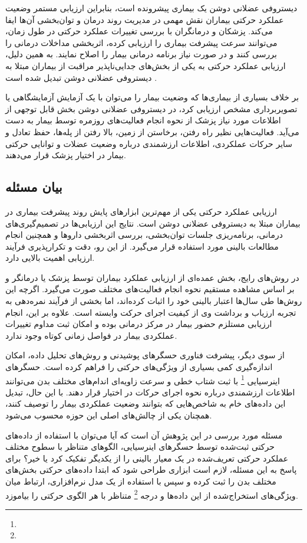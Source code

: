 دیستروفی عضلانی دوشن یک بیماری پیشرونده است، بنابراین ارزیابی مستمر وضعیت عملکرد حرکتی بیماران نقش مهمی در مدیریت روند درمان و توان‌بخشی آن‌ها ایفا می‌کند. پزشکان و درمانگران با بررسی تغییرات عملکرد حرکتی در طول زمان، می‌توانند سرعت پیشرفت بیماری را ارزیابی کرده، اثربخشی مداخلات درمانی را بررسی کنند و در صورت نیاز برنامه درمانی بیمار را اصلاح نمایند. به همین دلیل، ارزیابی عملکرد حرکتی به یکی از بخش‌های جدایی‌ناپذیر مراقبت از بیماران مبتلا به دیستروفی عضلانی دوشن تبدیل شده است \cite{Bushby2010Diagnosis}.

بر خلاف بسیاری از بیماری‌ها که وضعیت بیمار را می‌توان با یک آزمایش آزمایشگاهی یا تصویربرداری مشخص ارزیابی کرد، در دیستروفی عضلانی دوشن بخش قابل توجهی از اطلاعات مورد نیاز پزشک از نحوه انجام فعالیت‌های روزمره توسط بیمار به دست می‌آید. فعالیت‌هایی نظیر راه رفتن، برخاستن از زمین، بالا رفتن از پله‌ها، حفظ تعادل و سایر حرکات عملکردی، اطلاعات ارزشمندی درباره وضعیت عضلات و توانایی حرکتی بیمار در اختیار پزشک قرار می‌دهند.

\subsection{بیان مسئله}

ارزیابی عملکرد حرکتی یکی از مهم‌ترین ابزارهای پایش روند پیشرفت بیماری در بیماران مبتلا به دیستروفی عضلانی دوشن است. نتایج این ارزیابی‌ها در تصمیم‌گیری‌های درمانی، برنامه‌ریزی جلسات توان‌بخشی، بررسی اثربخشی داروها و همچنین انجام مطالعات بالینی مورد استفاده قرار می‌گیرد. از این رو، دقت و تکرارپذیری فرآیند ارزیابی اهمیت بالایی دارد.

در روش‌های رایج، بخش عمده‌ای از ارزیابی عملکرد بیماران توسط پزشک یا درمانگر و بر اساس مشاهده مستقیم نحوه انجام فعالیت‌های مختلف صورت می‌گیرد. اگرچه این روش‌ها طی سال‌ها اعتبار بالینی خود را اثبات کرده‌اند، اما بخشی از فرآیند نمره‌دهی به تجربه ارزیاب و برداشت وی از کیفیت اجرای حرکت وابسته است. علاوه بر این، انجام ارزیابی مستلزم حضور بیمار در مرکز درمانی بوده و امکان ثبت مداوم تغییرات عملکردی بیمار در فواصل زمانی کوتاه وجود ندارد.

از سوی دیگر، پیشرفت فناوری حسگرهای پوشیدنی و روش‌های تحلیل داده، امکان اندازه‌گیری کمی بسیاری از ویژگی‌های حرکتی را فراهم کرده است. حسگرهای اینرسیایی
\footnote{}
با ثبت شتاب خطی و سرعت زاویه‌ای اندام‌های مختلف بدن می‌توانند اطلاعات ارزشمندی درباره نحوه اجرای حرکات در اختیار قرار دهند. با این حال، تبدیل این داده‌های خام به شاخص‌هایی که بتوانند وضعیت عملکردی بیمار را توصیف کنند، همچنان یکی از چالش‌های اصلی این حوزه محسوب می‌شود.
 
 مسئله مورد بررسی در این پژوهش آن است که آیا می‌توان با استفاده از داده‌های حرکتی ثبت‌شده توسط حسگرهای اینرسیایی، الگوهای متناظر با سطوح مختلف عملکرد حرکتی تعریف‌شده در یک معیار بالینی را از یکدیگر تفکیک کرد یا خیر؟ برای پاسخ به این مسئله، لازم است ابزاری طراحی شود که ابتدا داده‌های حرکتی بخش‌های مختلف بدن را ثبت کرده و سپس با استفاده از یک مدل نرم‌افزاری، ارتباط میان ویژگی‌های استخراج‌شده از این داده‌ها و درجه
 \footnote{}
 متناظر با هر الگوی حرکتی را بیاموزد.
 
